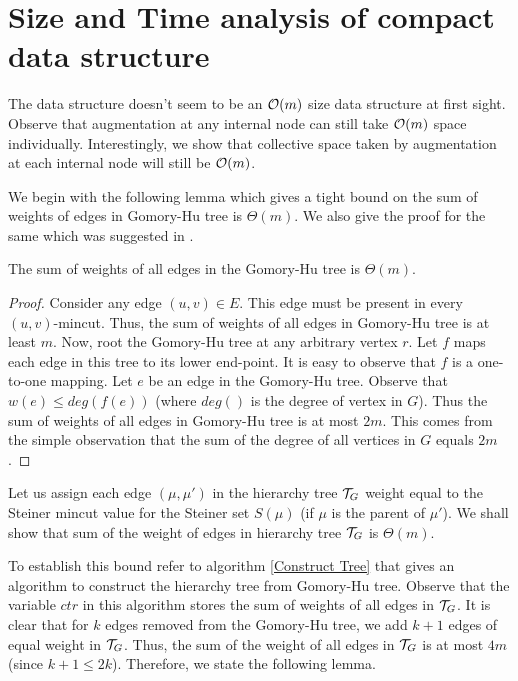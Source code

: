\section{Size and Time analysis of compact data structure}
\label{appendix:size-time-analysis-compact-ds}

The data structure doesn't seem to be an ${\cal O}(m)$ size data structure at first sight. Observe that augmentation at any internal node can still take ${\cal O}(m)$ space individually. Interestingly, we show that collective space taken by augmentation at each internal node will still be ${\cal O}(m)$.

We begin with the following lemma which gives a tight bound on the sum of weights of edges in Gomory-Hu tree is $\Theta(m)$. We also give the proof for the same which was suggested in \cite{DBLP:conf/stoc/HariharanKPB07,DBLP:journals/siamcomp/DinitzV00}.

\begin{lemma}
\label{fact:GH-weight}
The sum of weights of all edges in the Gomory-Hu tree is ${\Theta}(m)$.
\end{lemma}
\begin{proof}
Consider any edge $(u,v)\in E$. This edge must be present in every $(u,v)$-mincut. Thus, the sum of weights of all edges in Gomory-Hu tree is at least $m$. Now, root the Gomory-Hu tree at any arbitrary vertex $r$. Let $f$ maps each edge in this tree to its lower end-point. It is easy to observe that $f$ is a one-to-one mapping. Let $e$ be an edge in the Gomory-Hu tree. Observe that $w(e) \leq deg(f(e))$ (where $deg()$ is the degree of vertex in $G$). Thus the sum of weights of all edges in Gomory-Hu tree is at most $2m$. This comes from the simple observation that the sum of the degree of all vertices in $G$ equals $2m$.
\end{proof}

Let us assign each edge $(\mu,\mu')$ in the hierarchy tree ${\cal T}_G$ weight equal to the Steiner mincut value for the Steiner set $S(\mu)$ (if $\mu$ is the parent of $\mu'$). We shall show that sum of the weight of edges in hierarchy tree ${\cal T}_G$ is $\Theta(m)$. %

To establish this bound refer to algorithm \ref{Construct Tree} that gives an algorithm to construct the hierarchy tree from Gomory-Hu tree. Observe that the variable $ctr$ in this algorithm stores the sum of weights of all edges in ${\cal T}_G$. It is clear that for $k$ edges removed from the Gomory-Hu tree, we add $k+1$ edges of equal weight in ${\cal T}_G$. Thus, the sum of the weight of all edges in ${\cal T}_G$ is at most $4m$ (since $k+1 \leq 2k$). Therefore, we state the following lemma.

